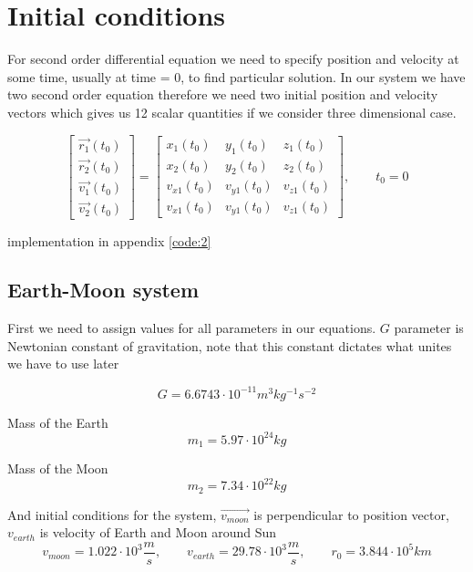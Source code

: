 \documentclass[english,12pt,a4paper, notitlepage]{report}
\begin{document}
	\section{Initial conditions}
	
	For second order differential equation we need to specify position and velocity at some time, usually at time = 0, to find particular solution. In our system we have two second order equation therefore we need two initial position and velocity vectors which gives us 12 scalar quantities if we consider three dimensional case.
	
	\begin{equation}
		\begin{bmatrix}
			\vec{r_1}(t_0) \\ \vec{r_2}(t_0) \\ \vec{v_1}(t_0) \\ \vec{v_2}(t_0)
		\end{bmatrix}
		=
		\begin{bmatrix}
			x_1(t_0) & y_1(t_0) & z_1(t_0)\\
			x_2(t_0) & y_2(t_0) & z_2(t_0)\\
			v_{x1}(t_0) & v_{y1}(t_0) & v_{z1}(t_0)\\
			v_{x1}(t_0) & v_{y1}(t_0) & v_{z1}(t_0)
		\end{bmatrix}
		, \qquad t_0 = 0
	\end{equation}
	
	implementation in appendix \ref{code:2}
	
	\subsection{Earth-Moon system}
	
	First we need to assign values for all parameters in our equations.
	$G$ parameter is Newtonian constant of gravitation, note that this constant dictates what unites we have to use later
	
	\begin{equation}\label{eq:G}
		G = 6.6743 \cdot 10^{-11} m^3 kg^{-1} s^{-2}
	\end{equation}
	
	Mass of the Earth
	$$ m_1 = 5.97 \cdot 10^{24} kg $$
	
	Mass of the Moon
	$$ m_2 = 7.34 \cdot 10^{22} kg $$
	
	And initial conditions for the system, $\vec{v_{moon}}$ is perpendicular to position vector, $v_{earth}$ is velocity of Earth and Moon around Sun
	$$
	v_{moon} = 1.022 \cdot 10^3 \frac{m}{s}
	, \qquad v_{earth} = 29.78 \cdot 10^3 \frac{m}{s}
	, \qquad r_0 = 3.844 \cdot 10^5 km
	$$
	
\end{document}
